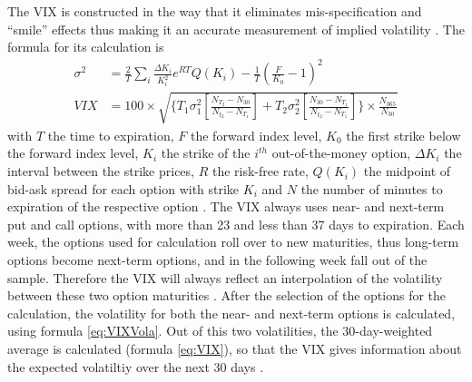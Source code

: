 The \ac{VIX} is constructed in the way that it eliminates mis-specification and ``smile'' effects thus making it an accurate measurement of implied volatility \parencite{blair2001}. The formula for its calculation is
\begin{align}
\sigma^{2} &= \frac{2}{T} \sum_{i} \frac{\Delta K_{i}}{K_{i}^{2}} e^{RT} Q(K_{i}) - \frac{1}{T} (\frac{F}{K_{0}} - 1)^{2} \label{eq:VIXVola}\\
VIX &= 100 \times \sqrt{ \lbrace T_{1}\sigma^{2}_{1}[\frac{N_{T_{2}} - N_{30}}{N_{t_{2}}-N_{T_{1}}}] + T_{2}\sigma^{2}_{2}[\frac{N_{30} - N_{T_{1}}}{N_{t_{2}}-N_{T_{1}}}] \rbrace \times \frac{N_{365}}{N_{30}}} \label{eq:VIX}
\end{align}
with $T$ the time to expiration, $F$ the forward index level, $K_{0}$ the first strike below the forward index level, $K_{i}$ the strike of the $i^{th}$ out-of-the-money option, $\Delta K_{i}$ the interval between the strike prices, $R$ the risk-free rate, $Q(K_{i})$ the midpoint of bid-ask spread for each option with strike $K_{i}$ and $N$ the number of minutes to expiration of the respective option \parencite{exchange2009}. The \ac{VIX} always uses near- and next-term put and call options, with more than 23 and less than 37 days to expiration. Each week, the options used for calculation roll over to new maturities, thus long-term options become next-term options, and in the following week fall out of the sample. Therefore the \ac{VIX} will always reflect an interpolation of the volatility between these two option maturities \parencite{poon2003}. After the selection of the options for the calculation, the volatility for both the near- and next-term options is calculated, using formula \ref{eq:VIXVola}. Out of this two volatilities, the 30-day-weighted average is calculated (formula \ref{eq:VIX}), so that the \ac{VIX} gives information about the expected volatiltiy over the next 30 days \parencite{exchange2009}. 






